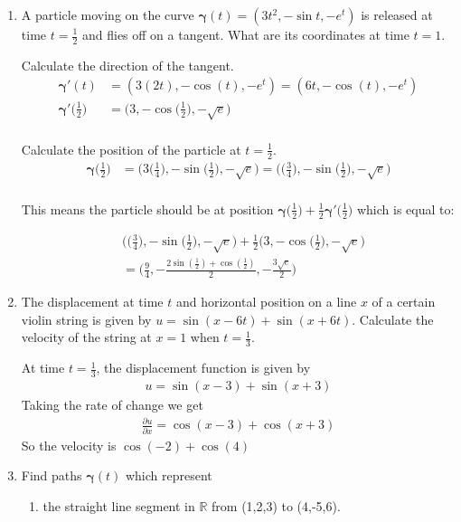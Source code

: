 \documentclass{article}
\begin{document}
\thispagestyle{fancy}

\begin{enumerate}
\item A particle moving on the curve $\boldsymbol{\gamma}(t) = (3t^2, -\sin t, -e^t)$ is released at time $t=\frac{1}{2}$ and flies off on a tangent. What are its coordinates at time $t=1$. 

Calculate the direction of the tangent.
\begin{align*} 
    \boldsymbol{\gamma}'(t) &= (3(2t), -\cos(t), -e^t) = (6t,-\cos(t), -e^t) \\
    \boldsymbol{\gamma}'\Big(\frac{1}{2}\Big) &= \Big(3, -\cos\Big(\frac{1}{2}\Big), -\sqrt{e}\Big)\\
\end{align*}

Calculate the position of the particle at $t=\frac{1}{2}$.
\begin{align*} 
    \boldsymbol{\gamma}\Big(\frac{1}{2}\Big) &= \Big(3\Big(\frac{1}{4}\Big), -\sin\Big(\frac{1}{2}\Big), -\sqrt{e}\Big) = \Big(\Big(\frac{3}{4}\Big), -\sin\Big(\frac{1}{2}\Big), -\sqrt{e}\Big)\\
\end{align*}

This means the particle should be at position $\displaystyle \boldsymbol{\gamma} \Big(\frac{1}{2}\Big) + \frac{1}{2} \boldsymbol{\gamma}' \Big( \frac{1}{2} \Big)$ which is equal to:

\begin{align*} 
    & \Big(\Big(\frac{3}{4}\Big), -\sin\Big(\frac{1}{2}\Big), -\sqrt{e}\Big) + \frac{1}{2}\Big(3, -\cos\Big(\frac{1}{2}\Big), -\sqrt{e}\Big) \\
    &= \Big(\frac{9}{4}, -\frac{ 2 \sin(\frac{1}{2}) + \cos(\frac{1}{2})}{2},-\frac{3\sqrt{e}}{2}\Big)
\end{align*}
\newpage
\item The displacement at time $t$ and horizontal position on a line $x$ of a certain violin string is given by $u=\sin(x-6t) + \sin(x+6t)$. Calculate the velocity of the string at $x=1$ when $t=\frac{1}{3}$.

At time $t=\frac{1}{3}$, the displacement function is given by
\begin{align*} 
    u = \sin(x-3) + \sin(x+3)
\end{align*}
Taking the rate of change we get
\begin{align*} 
    \frac{\partial u}{\partial x} = \cos(x-3) + \cos(x+3)
\end{align*}
So the velocity is $\cos(-2) + \cos(4)$
\newpage
\item Find paths $\boldsymbol{\gamma}(t)$ which represent
\begin{enumerate}
    \item the straight line segment in $\mathbb{R}$ from (1,2,3) to (4,-5,6).


\end{enumerate}
\end{enumerate}
\end{document}
